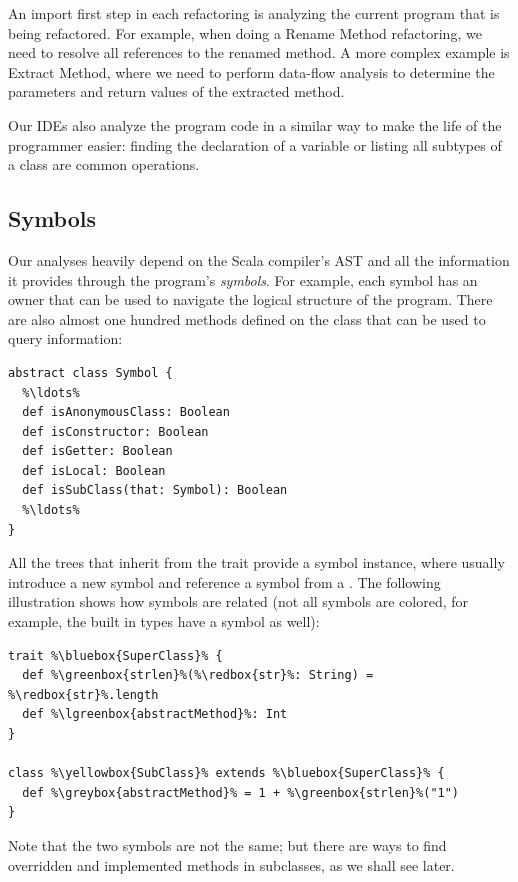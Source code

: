 An import first step in each refactoring is analyzing the current program that is being refactored. For example, when doing a Rename Method refactoring, we need to resolve all references to the renamed method. A more complex example is Extract Method, where we need to perform data-flow analysis to determine the parameters and return values of the extracted method.

Our IDEs also analyze the program code in a similar way to make the life of the programmer easier: finding the declaration of a variable or listing all subtypes of a class are common operations.

\subsection{Symbols}

Our analyses heavily depend on the Scala compiler's AST and all the information it provides through the program's \textit{symbols}. For example, each symbol has an owner that can be used to navigate the logical structure of the program. There are also almost one hundred  methods defined on the  class that can be used to query information:
\begin{lstlisting}
abstract class Symbol {
  %\ldots%
  def isAnonymousClass: Boolean
  def isConstructor: Boolean
  def isGetter: Boolean
  def isLocal: Boolean
  def isSubClass(that: Symbol): Boolean
  %\ldots%
}
\end{lstlisting}

All the trees that inherit from the  trait provide a symbol instance, where  usually introduce a new symbol and  reference a symbol from a . The following illustration shows how symbols are related (not all symbols are colored, for example, the built in types have a symbol as well):

\begin{lstlisting}
trait %\bluebox{SuperClass}% {
  def %\greenbox{strlen}%(%\redbox{str}%: String) = %\redbox{str}%.length
  def %\lgreenbox{abstractMethod}%: Int
}

class %\yellowbox{SubClass}% extends %\bluebox{SuperClass}% {
  def %\greybox{abstractMethod}% = 1 + %\greenbox{strlen}%("1")
}
\end{lstlisting}

Note that the two  symbols are not the same; but there are ways to find overridden and implemented methods in subclasses, as we shall see later.

